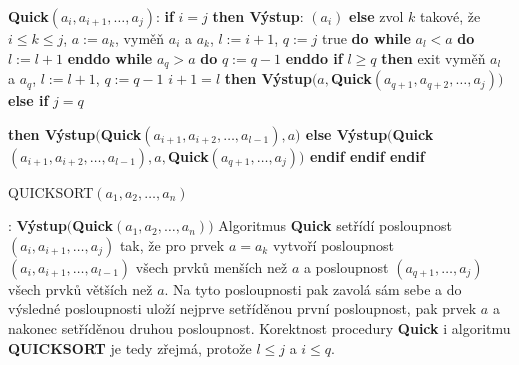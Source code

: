\documentclass[a4paper,12pt]{article}
\begin{document}
{\bf Quick$(a_i,a_{i+1},\dots,a_j)$}:\newline 
{\bf if} $i=j$ {\bf then\newline 
\phantom{{\rm ---}}Výstup}: $(a_i)$\newline 
{\bf else\newline 
\phantom{{\rm ---}}}zvol $k$ takové, že $i\le k\le j$, $a:=a_k$, 
vyměň $a_i$ a $a_k$, $l:=i+1$, $q:=j$\newline 
\phantom{---}{\bf while} true {\bf do\newline 
\phantom{{\rm ------}}while} $a_l<a$ {\bf do} $l:=l+1$ {\bf enddo\newline 
\phantom{{\rm ------}}while} $a_q>a$ {\bf do} $q:=q-1$ {\bf enddo\newline 
\phantom{{\rm ------}}if} $l\ge q$ {\bf then\newline 
\phantom{{\rm ---------}}}exit\newline 
{}vyměň $a_l$ a $a_q$, $l:=l+1$, $q
:=q-1$\newline 
{} $i+1=l$ {\bf then\newline 
\phantom{{\rm ------}}Výstup$(a,$Quick$(a_{q+1},a_{q+2},\dots,a_
j))$\newline 
\phantom{{\rm ---}}else\newline 
\phantom{{\rm ------}}if} $j=q$ {\bf then\newline 
\phantom{{\rm ---------}}Výstup$($Quick$(a_{i+1},a_{i+2},\dots,
a_{l-1}),a)$\newline 
\phantom{{\rm ------}}else\newline 
\phantom{{\rm ---------}}Výstup$($Quick$(a_{i+1},a_{i+2},\dots,
a_{l-1}),a,$Quick$(a_{q+1},\dots,a_j))$\newline 
\phantom{{\rm ------}}endif\newline 
\phantom{{\rm ---}}endif\newline 
endif

QUICKSORT$(a_1,a_2,\dots,a_n)$}:\newline 
{\bf Výstup$($Quick$(a_1,a_2,\dots,a_n))$
}
Algoritmus {\bf Quick} setřídí posloupnost 
$(a_i,a_{i+1},\dots,a_j)$ tak, že pro prvek $a=a_k$ vytvoří posloupnost 
$(a_i,a_{i+1},\dots,a_{l-1})$ všech prvků menších než $
a$ 
a posloupnost
$(a_{q+1},\dots,a_j)$ všech prvků 
větších než $a$. Na tyto posloupnosti pak 
zavolá sám sebe a do výsledné posloupnosti uloží 
nejprve setříděnou první posloupnost, pak prvek $a$ a nakonec 
setříděnou druhou posloupnost. Korektnost procedury 
{\bf Quick}  i algoritmu {\bf QUICKSORT} je tedy zřejmá, protože 
$l\le j$ a $i\le q$. 
\end{document}
